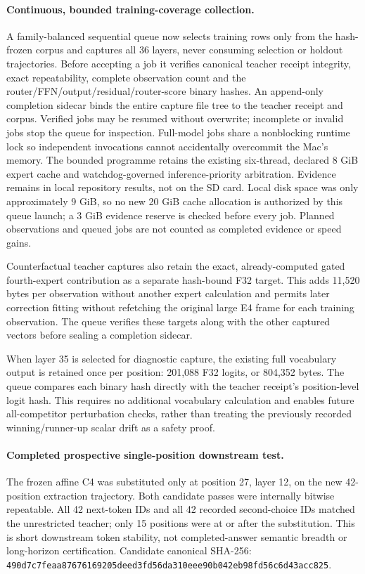 \paragraph{Continuous, bounded training-coverage collection.}
A family-balanced sequential queue now selects training rows only from the
hash-frozen corpus and captures all 36 layers, never consuming selection or
holdout trajectories.  Before accepting a job it verifies canonical teacher
receipt integrity, exact repeatability, complete observation count and the
router/FFN/output/residual/router-score binary hashes.  An append-only completion
sidecar binds the entire capture file tree to the teacher receipt and corpus.
Verified jobs may be resumed without overwrite; incomplete or invalid jobs stop
the queue for inspection.  Full-model jobs share a nonblocking runtime lock so
independent invocations cannot accidentally overcommit the Mac's memory.
The bounded programme retains the existing six-thread, declared 8 GiB expert
cache and watchdog-governed inference-priority arbitration.  Evidence remains
in local repository results, not on the SD card.  Local disk space was only
approximately 9 GiB, so no new 20 GiB cache allocation is authorized by this
queue launch; a 3 GiB evidence reserve is checked before every job.  Planned
observations and queued jobs are not counted as completed evidence or speed
gains.

Counterfactual teacher captures also retain the exact, already-computed gated
fourth-expert contribution as a separate hash-bound F32 target.  This adds
11,520 bytes per observation without another expert calculation and permits
later correction fitting without refetching the original large E4 frame for
each training observation.  The queue verifies these targets along with the
other captured vectors before sealing a completion sidecar.

When layer 35 is selected for diagnostic capture, the existing full vocabulary
output is retained once per position: 201,088 F32 logits, or 804,352 bytes.
The queue compares each binary hash directly with the teacher receipt's
position-level logit hash.  This requires no additional vocabulary calculation
and enables future all-competitor perturbation checks, rather than treating
the previously recorded winning/runner-up scalar drift as a safety proof.

\paragraph{Completed prospective single-position downstream test.}
The frozen affine C4 was substituted only at position 27, layer 12, on the new
42-position extraction trajectory.  Both candidate passes were internally
bitwise repeatable.  All 42 next-token IDs and all 42 recorded second-choice
IDs matched the unrestricted teacher; only 15 positions were at or after the
substitution.  This is short downstream token stability, not completed-answer
semantic breadth or long-horizon certification.  Candidate canonical SHA-256:
\texttt{490d7c7feaa87676169205deed3fd56da310eee90b042eb98fd56c6d43acc825}.


